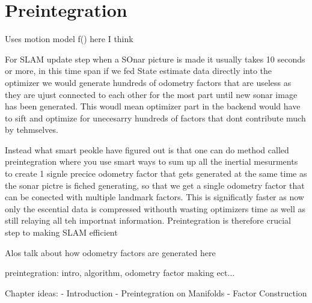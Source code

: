 \section{Preintegration}

Uses motion model f() here I think

For SLAM update step when a SOnar picture is made it usually takes 10 seconds or more, in this time span if we fed State estimate data directly into the optimizer we would generate hundreds of odometry factors that are useless as they are ujust connected to each other for the most part until new sonar image has been generated. This woudl mean optimizer part in the backend would have to sift and optimize for unecesarry hundreds of factors that dont contribute much by tehmselves.

Instead what smart peokle have figured out is that one can do method called preintegration where you use smart ways to sum up all the inertial mesurments to create 1 signle precice odometry factor that gets generated at the same time as the sonar pictre is fiched generating, so that we get a single odometry factor that can be conected with multiple landmark factors. This is significatly faster as now only the escential data is compressed withouth wasting optimizers time as well as still relaying all teh importnat information. Preintegration is therefore crucial step to making SLAM efficient

Alos talk about how odometry factors are generated here

preintegration: intro, algorithm, odometry factor making ect...

Chapter ideas:
- Introduction
- Preintegration on Manifolds
- Factor Construction

